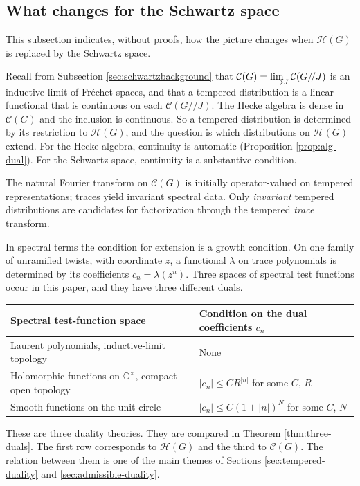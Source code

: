 \documentclass[12pt,letterpaper]{amsart}
\numberwithin{equation}{section}
\theoremstyle{definition}
\theoremstyle{remark}
\newcommand{\calH}{\mathcal H}
\newcommand{\calC}{\mathcal C}
\begin{document}
\subsection{What changes for the Schwartz space}\label{sec:schwartz}
This subsection indicates, without proofs, how the picture changes when $\calH(G)$ is replaced by the Schwartz space.

Recall from Subsection \ref{sec:schwartzbackground} that $\calC(G)=\varinjlim_J\calC(G/\!/J)$ is an inductive limit of Fr\'echet spaces, and that a tempered distribution is a linear functional that is continuous on each $\calC(G/\!/J)$. The Hecke algebra is dense in $\calC(G)$ and the inclusion is continuous. So a tempered distribution is determined by its restriction to $\calH(G)$, and the question is which distributions on $\calH(G)$ extend. For the Hecke algebra, continuity is automatic (Proposition \ref{prop:alg-dual}). For the Schwartz space, continuity is a substantive condition.

The natural Fourier transform on $\calC(G)$ is initially operator-valued on tempered representations; traces yield invariant spectral data. Only \emph{invariant} tempered distributions are candidates for factorization through the tempered \emph{trace} transform.

In spectral terms the condition for extension is a growth condition. On one family of unramified twists, with coordinate $z$, a functional $\lambda$ on trace polynomials is determined by its coefficients $c_n=\lambda(z^n)$. Three spaces of spectral test functions occur in this paper, and they have three different duals.
\begin{center}\small
\begin{tabularx}{\linewidth}{@{}p{.43\linewidth}X@{}}\toprule
Spectral test-function space & Condition on the dual coefficients $c_n$\\\midrule
Laurent polynomials, inductive-limit topology & None\\
Holomorphic functions on $\mathbb C^\times$, compact-open topology & $|c_n|\le CR^{|n|}$ for some $C$, $R$\\
Smooth functions on the unit circle & $|c_n|\le C(1+|n|)^N$ for some $C$, $N$\\\bottomrule
\end{tabularx}
\end{center}
These are three duality theories. They are compared in Theorem \ref{thm:three-duals}. The first row corresponds to $\calH(G)$ and the third to $\calC(G)$. The relation between them is one of the main themes of Sections \ref{sec:tempered-duality} and \ref{sec:admissible-duality}.
\end{document}
